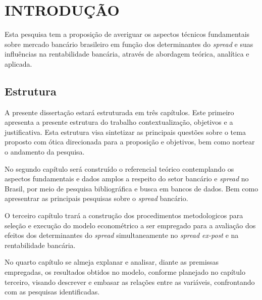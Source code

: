 \documentclass[
  12pt,
  12pt,
  openright,
  oneside,
  a4paper,
  chapter=TITLE,
  section=TITLE,
  subsection=TITLE,
  subsubsection=TITLE,
  english,
  portugues,
  sumario=tradicional]{abntex2}
\begin{document}





\textual
\pagestyle{simple}
\parindent 1.50cm

\chapter[INTRODUÇÃO]{INTRODUÇÃO}

Esta pesquisa tem a proposição de averiguar os aspectos técnicos fundamentais sobre mercado bancário brasileiro em função dos determinantes do \emph{spread} e suas influências na rentabilidade bancária, através de abordagem teórica, analítica e aplicada.

\section{Estrutura}

A presente dissertação estará estruturada em três capítulos. Este primeiro apresenta a presente estrutura do trabalho contextualização, objetivos e a justificativa. Esta estrutura visa sintetizar as principais questões sobre o tema proposto com ótica direcionada para a proposição e objetivos, bem como nortear o andamento da pesquisa.

No segundo capítulo será construído o referencial teórico contemplando os aspectos fundamentais e dados amplos a respeito do setor bancário e \emph{spread} no Brasil, por meio de pesquisa bibliográfica e busca em bancos de dados. Bem como apresentrar as principais pesquisas sobre o \emph{spread} bancário.

O terceiro capítulo trará a construção dos procedimentos metodologicos para seleção e execução do modelo econométrico a ser empregado para a avaliação dos efeitos dos determinantes do \emph{spread} simultaneamente no \emph{spread ex-post} e na rentabilidade bancária.

No quarto capítulo se almeja explanar e analisar, diante as premissas empregadas, os resultados obtidos no modelo, conforme planejado no capítulo terceiro, visando descrever e embasar as relações entre as variáveis, confrontando com as pesquisas identificadas.
\end{document}
